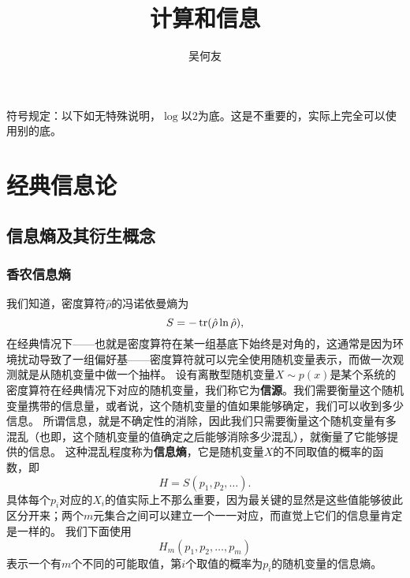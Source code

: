 \documentclass[UTF8, a4paper]{ctexart}
\title{计算和信息}
\author{吴何友}
\begin{document}
\maketitle

符号规定：以下如无特殊说明，$\log$以$2$为底。这是不重要的，实际上完全可以使用别的底。

\section{经典信息论}

\subsection{信息熵及其衍生概念}

\subsubsection{香农信息熵}

我们知道，密度算符$\hat{\rho}$的冯诺依曼熵为
\begin{equation}
    S = - \trace (\hat{\rho} \ln \hat{\rho}),
\end{equation}
在经典情况下——也就是密度算符在某一组基底下始终是对角的，这通常是因为环境扰动导致了一组偏好基——密度算符就可以完全使用随机变量表示，而做一次观测就是从随机变量中做一个抽样。
设有离散型随机变量$X \sim p(x)$是某个系统的密度算符在经典情况下对应的随机变量，我们称它为\textbf{信源}。我们需要衡量这个随机变量携带的信息量，或者说，这个随机变量的值如果能够确定，我们可以收到多少信息。
所谓信息，就是不确定性的消除，因此我们只需要衡量这个随机变量有多混乱（也即，这个随机变量的值确定之后能够消除多少混乱），就衡量了它能够提供的信息。
这种混乱程度称为\textbf{信息熵}，它是随机变量$X$的不同取值的概率的函数，即
\[
    H = S(p_1, p_2, \ldots).
\]
具体每个$p_i$对应的$X_i$的值实际上不那么重要，因为最关键的显然是这些值能够彼此区分开来；两个$m$元集合之间可以建立一个一一对应，而直觉上它们的信息量肯定是一样的。
我们下面使用
\[
    H_m (p_1, p_2, \ldots, p_m)
\]
表示一个有$m$个不同的可能取值，第$i$个取值的概率为$p_i$的随机变量的信息熵。
\end{document}
